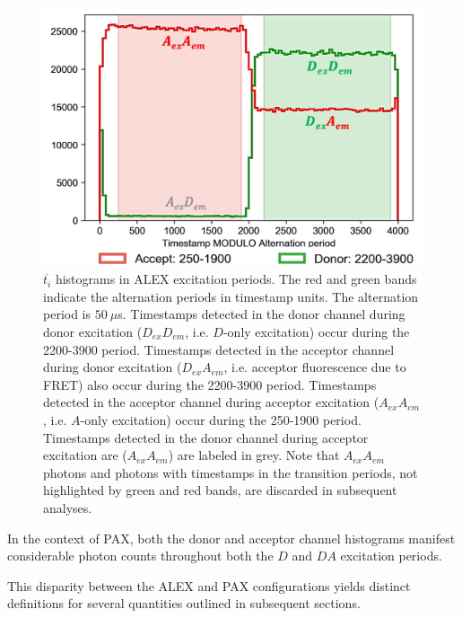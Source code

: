 \begin{figure}
    \centering
    \includegraphics[width=\textwidth]{chapters/figures/alternation_hist.jpg}
    \caption{\label{fig:alternation_hist} 
    $\overline{t_i}$ histograms in ALEX excitation periods.
    The red and green bands indicate the alternation periods in timestamp units.
    The alternation period is $50~\mu$s.
    Timestamps detected in the donor channel during donor excitation ($D_{ex}D_{em}$, i.e. $D$-only excitation) occur during the 2200-3900 period.
    Timestamps detected in the acceptor channel during donor excitation ($D_{ex}A_{em}$, i.e. acceptor fluorescence due to FRET) also occur during the 2200-3900 period.
    Timestamps detected in the acceptor channel during acceptor excitation ($A_{ex}A_{em}$, i.e. $A$-only excitation) occur during the 250-1900 period.
    Timestamps detected in the donor channel during acceptor excitation are ($A_{ex}A_{em}$) are labeled in grey.
    Note that $A_{ex}A_{em}$ photons and photons with timestamps in the transition periods, not highlighted by green and red bands, are discarded in subsequent analyses.
    }
\end{figure}

In the context of \ac{PAX}, both the donor and acceptor channel histograms manifest considerable photon counts throughout both the $D$ and $DA$ excitation periods.

This disparity between the \ac{ALEX} and \ac{PAX} configurations yields distinct definitions for several quantities outlined in subsequent sections.

